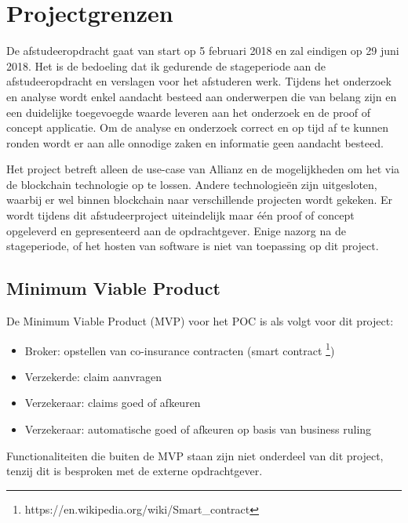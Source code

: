 \chapter{Projectgrenzen}
De afstudeeropdracht gaat van start op 5 februari 2018 en zal eindigen op 29 juni 2018. Het is de bedoeling dat ik gedurende de stageperiode aan de afstudeeropdracht en verslagen voor het afstuderen werk. Tijdens het onderzoek en analyse wordt enkel aandacht besteed aan onderwerpen die van belang zijn en een duidelijke toegevoegde waarde leveren aan het onderzoek en de proof of concept applicatie. Om de analyse en onderzoek correct en op tijd af te kunnen ronden wordt er aan alle onnodige zaken en informatie geen aandacht besteed.\par
Het project betreft alleen de use-case van Allianz en de mogelijkheden om het via de blockchain technologie op te lossen. Andere technologieën zijn uitgesloten, waarbij er wel binnen blockchain naar verschillende projecten wordt gekeken. Er wordt tijdens dit afstudeerproject uiteindelijk maar één proof of concept opgeleverd en gepresenteerd aan de opdrachtgever. Enige nazorg na de stageperiode, of het hosten van software is niet van toepassing op dit project.

\section{Minimum Viable Product}
De Minimum Viable Product (MVP) voor het POC is als volgt voor dit project:
\begin{itemize}
  \item Broker: opstellen van co-insurance contracten (smart contract \footnote{https://en.wikipedia.org/wiki/Smart\_contract})
  \item Verzekerde: claim aanvragen
  \item Verzekeraar: claims goed of afkeuren
  \item Verzekeraar: automatische goed of
afkeuren op basis van business ruling
\end{itemize}
Functionaliteiten die buiten de MVP staan zijn niet onderdeel van dit project, tenzij dit is besproken met de externe opdrachtgever.